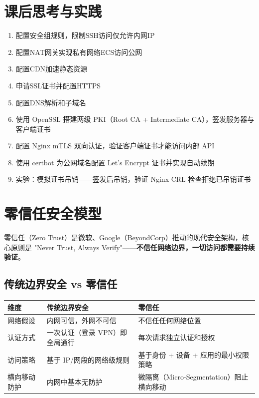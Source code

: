 \documentclass[12pt,UTF8]{ctexbook}
\begin{document}
\section{课后思考与实践}
\label{sec:cloud-security-practice}
\begin{enumerate}
    \item 配置安全组规则，限制SSH访问仅允许内网IP
    \item 配置NAT网关实现私有网络ECS访问公网
    \item 配置CDN加速静态资源
    \item 申请SSL证书并配置HTTPS
    \item 配置DNS解析和子域名
    \item 使用 OpenSSL 搭建两级 PKI（Root CA + Intermediate CA），签发服务器与客户端证书
    \item 配置 Nginx mTLS 双向认证，验证客户端证书才能访问内部 API
    \item 使用 certbot 为公网域名配置 Let's Encrypt 证书并实现自动续期
    \item 实验：模拟证书吊销——签发后吊销，验证 Nginx CRL 检查拒绝已吊销证书
\end{enumerate}

\section{零信任安全模型}
\label{sec:zero-trust}

零信任（Zero Trust）是微软、Google（BeyondCorp）推动的现代安全架构，核心原则是 "Never Trust, Always Verify"——\textbf{不信任网络边界，一切访问都需要持续验证}。

\subsection{传统边界安全 vs 零信任}

\begin{tabular}{|p{3.5cm}|p{4.5cm}|p{4.5cm}|}
\hline
\textbf{维度} & \textbf{传统边界安全} & \textbf{零信任} \\
\hline
网络假设 & 内网可信，外网不可信 & 不信任任何网络位置 \\
\hline
认证方式 & 一次认证（登录 VPN）即全局通行 & 每次请求独立认证和授权 \\
\hline
访问策略 & 基于 IP/网段的网络级规则 & 基于身份 + 设备 + 应用的最小权限策略 \\
\hline
横向移动防护 & 内网中基本无防护 & 微隔离（Micro-Segmentation）阻止横向移动 \\
\hline
\end{tabular}
\end{document}
